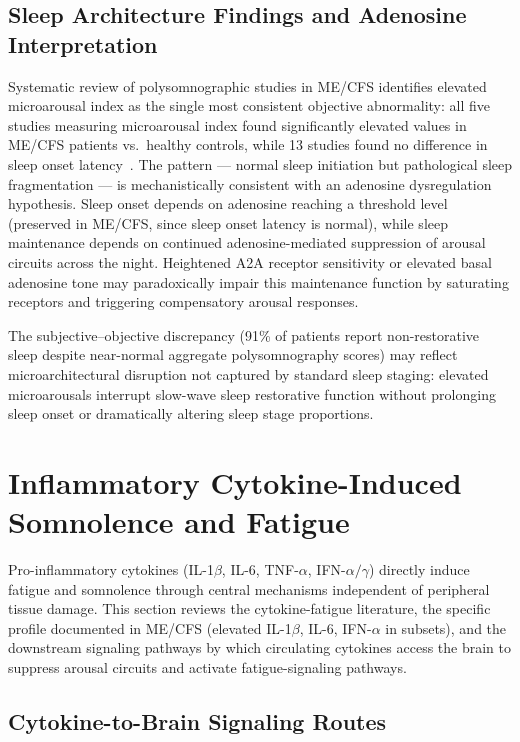 \subsection{Sleep Architecture Findings and Adenosine Interpretation}

Systematic review of polysomnographic studies in ME/CFS identifies elevated microarousal index as the single most consistent objective abnormality: all five studies measuring microarousal index found significantly elevated values in ME/CFS patients vs.~healthy controls, while 13 studies found no difference in sleep onset latency~\cite{Maksoud2021SleepMECFS}. The pattern --- normal sleep initiation but pathological sleep fragmentation --- is mechanistically consistent with an adenosine dysregulation hypothesis. Sleep onset depends on adenosine reaching a threshold level (preserved in ME/CFS, since sleep onset latency is normal), while sleep maintenance depends on continued adenosine-mediated suppression of arousal circuits across the night. Heightened A2A receptor sensitivity or elevated basal adenosine tone may paradoxically impair this maintenance function by saturating receptors and triggering compensatory arousal responses.

The subjective--objective discrepancy (91\% of patients report non-restorative sleep despite near-normal aggregate polysomnography scores) may reflect microarchitectural disruption not captured by standard sleep staging: elevated microarousals interrupt slow-wave sleep restorative function without prolonging sleep onset or dramatically altering sleep stage proportions.


\section{Inflammatory Cytokine-Induced Somnolence and Fatigue}
\label{sec:ch15-cytokine-fatigue}

Pro-inflammatory cytokines (IL-1$\beta$, IL-6, TNF-$\alpha$, IFN-$\alpha/\gamma$) directly induce fatigue and somnolence through central mechanisms independent of peripheral tissue damage. This section reviews the cytokine-fatigue literature, the specific profile documented in ME/CFS (elevated IL-1$\beta$, IL-6, IFN-$\alpha$ in subsets), and the downstream signaling pathways by which circulating cytokines access the brain to suppress arousal circuits and activate fatigue-signaling pathways.

\subsection{Cytokine-to-Brain Signaling Routes}

